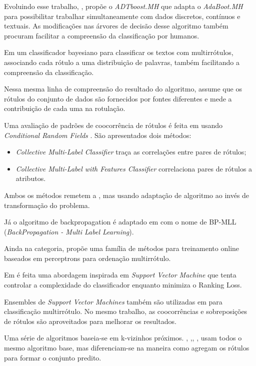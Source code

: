 \documentclass[runningheads,a4paper]{llncs}
\newcommand{\commentatside}[1]{\pdfcomment[color={0.045 0.278 0.643},icon=Note]{#1}}
\newcommand{\todo}[1]{\commentatside{#1}}
\begin{document}
Evoluindo esse trabalho, \cite{De_Comite2003-lg}, propõe o \textit{ADTboost.MH} que adapta o \textit{AdaBoot.MH} para possibilitar trabalhar simultaneamente com dados discretos, contínuos e textuais. As modificações nas árvores de decisão desse algoritmo também procuram facilitar a compreensão da classificação por humanos.

Em \cite{McCallum1999-iz} um classificador bayesiano para classificar os textos com multirrótulos, associando cada rótulo a uma distribuição de palavras, também facilitando a compreensão da classificação.

Nessa mesma linha de compreensão do resultado do algoritmo, \cite{Streich2008-vu} assume que os rótulos do conjunto de dados são fornecidos por fontes diferentes e mede a contribuição de cada uma na rotulação.

Uma avaliação de padrões de coocorrência de rótulos é feita em \cite{Ghamrawi2005-fw} usando \textit{Conditional Random Fields} \cite{Lafferty2001-ov}. São apresentados dois métodos: 

\begin{itemize}
\item \textit{Collective Multi-Label Classifier} traça as correlações entre pares de rótulos;
\item \textit{Collective Multi-Label with Features Classifier} correlaciona pares de rótulos a atributos.	
\end{itemize}

Ambos os métodos remetem a \cite{Hullermeier2008-co}, mas usando adaptação de algoritmo ao invés de transformação do problema.

Já o algoritmo de backpropagation é adaptado em \cite{Zhang2006-vf} com o nome de BP-MLL (\textit{BackPropagation - Multi Label Learning}).

Ainda na categoria, \cite{Crammer2003-su} propõe uma família de métodos para treinamento online baseados em perceptrons para ordenação multirrótulo.

Em \cite{Elisseeff2001-lp} é feita uma abordagem inspirada em \textit{Support Vector Machine} que tenta controlar a complexidade do classificador enquanto minimiza o Ranking Loss\todo{Ranking Loss ou Hamming Loss?}.

Ensembles de \textit{Support Vector Machines} também são utilizadas em \cite{Godbole2004-su} para classificação multirrótulo. No mesmo trabalho, as coocorrências e sobreposições de rótulos são aproveitados para melhorar os resultados.

Uma série de algoritmos baseia-se em k-vizinhos próximos. \cite{Zhang2007-id}, \cite{Luo2005-ac},\cite{Wieczorkowska2006-am}, \cite{Spyromitros2008-rs}, usam todos o mesmo algoritmo base, mas diferenciam-se na maneira como agregam os rótulos para formar o conjunto predito.
 
\end{document}
